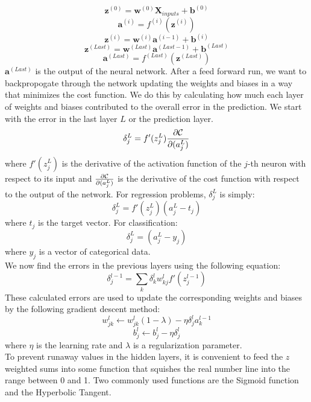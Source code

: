 \documentclass{emulateapj}
\begin{document}
\begin{equation}
    \mathbf{z}^{(0)} = \mathbf{w}^{(0)}\mathbf{X}_{inputs}+\mathbf{b}^{(0)}
\end{equation}
\begin{equation}
    \mathbf{a}^{(i)} = f^{(i)}(\mathbf{z}
    ^{(i)})
\end{equation}
\begin{equation}
    \mathbf{z}^{(i)} =
    \mathbf{w}^{(i)}\mathbf{a}^{(i-1)}+\mathbf{b}^{(i)}
\end{equation}
\begin{equation}
    \mathbf{z}^{(Last)} = \mathbf{w}^{(Last)}\mathbf{a}^{(Last-1)}+\mathbf{b}^{(Last)}
\end{equation}
\begin{equation}
    \mathbf{a}^{(Last)} = f^{(Last)}(\mathbf{z}
    ^{(Last)})
\end{equation}
$\mathbf{a}^{(Last)}$ is the output of the neural network. After a feed forward run, we want to backpropogate through the network updating the weights and biases in a way that minimizes the cost function. We do this by calculating how much each layer of weights and biases contributed to the overall error in the prediction. We start with the error in the last layer $L$ or the prediction layer.
\begin{equation}
    \delta_j^L = f'(z_j^L)\frac{\partial {\cal C}}{\partial (a_j^L)}
\end{equation}
where $f'(z_j^L)$ is the derivative of the activation function of the $j$-th neuron with respect to its input and $\frac{\partial {\cal C}}{\partial (a_j^L)}$ is the derivative of the cost function with respect to the output of the network. For regression problems, $\delta_j^L$ is simply:
\begin{equation}
    \delta_j^L = f'(z_j^L)(a_j^L - t_j)
\end{equation}
where $t_j$ is the target vector. For classification:
\begin{equation}
    \delta_j^L = (a_j^L - y_j)
\end{equation}
where $y_j$ is a vector of categorical data. \\We now find the errors in the previous layers using the following equation:
\begin{equation}
    \delta_j ^{l-1} = \sum_{k}\delta_k ^l w_{kj}^l f'(z_j ^{l-1})
\end{equation}
These calculated errors are used to update the corresponding weights and biases by the following gradient descent method:
\begin{equation}
    w_{jk}^l \leftarrow w_{jk}^l(1-\lambda) - \eta \delta_j ^l a_k^{l-1}
\end{equation}
\begin{equation}
    b_j^l \leftarrow b_j^l - \eta \delta_j^l
\end{equation}
where $\eta$ is the learning rate and $\lambda$ is a regularization parameter.\\To prevent runaway values in the hidden layers, it is convenient to feed the $z$ weighted sums into some function that squishes the real number line into the range between 0 and 1. Two commonly used functions are the Sigmoid function and the Hyperbolic Tangent.
\end{document}
